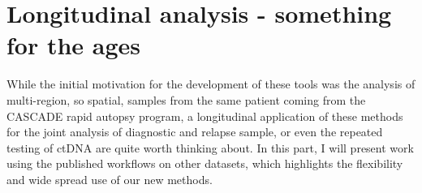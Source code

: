 \section[Longitudinal analysis]{Longitudinal analysis - something for the ages }
\label{variantcalling-sec:longitudinal}


While the initial motivation for the development of these tools was the analysis of multi-region, so spatial, samples from the same patient coming from the CASCADE rapid autopsy program, a longitudinal application of these methods for the joint analysis of diagnostic and relapse sample, or even the repeated testing of ctDNA are quite worth thinking about. In this part, I will present work using the published workflows on other datasets, which highlights the flexibility and wide spread use of our new methods.

